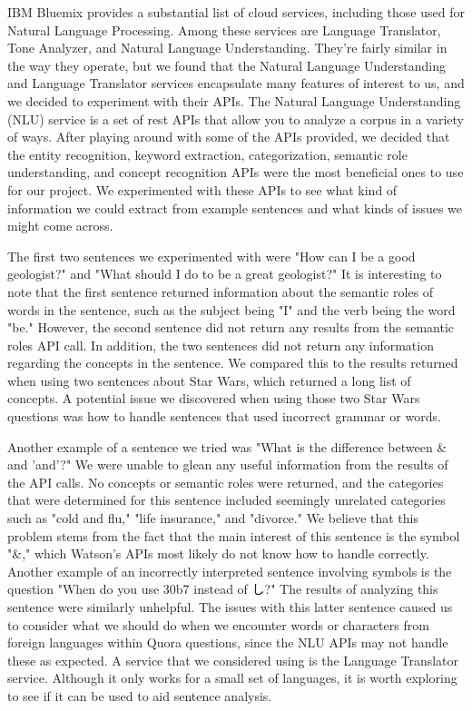 \documentclass{sig-alternate}
\begin{document}
IBM Bluemix provides a substantial list of cloud services, including those used for Natural Language Processing. Among these services are Language Translator, Tone Analyzer, and Natural Language Understanding. They're fairly similar in the way they operate, but we found that the Natural Language Understanding and Language Translator services encapsulate many features of interest to us, and we decided to experiment with their APIs. The Natural Language Understanding (NLU) service is a set of rest APIs that allow you to analyze a corpus in a variety of ways. After playing around with some of the APIs provided, we decided that the entity recognition, keyword extraction, categorization, semantic role understanding, and concept recognition APIs were the most beneficial ones to use for our project. We experimented with these APIs to see what kind of information we could extract from example sentences and what kinds of issues we might come across.

The first two sentences we experimented with were "How can I be a good geologist?" and "What should I do to be a great geologist?" It is interesting to note that the first sentence returned information about the semantic roles of words in the sentence, such as the subject being "I" and the verb being the word "be." However, the second sentence did not return any results from the semantic roles API call. In addition, the two sentences did not return any information regarding the concepts in the sentence. We compared this to the results returned when using two sentences about Star Wars, which returned a long list of concepts. A potential issue we discovered when using those two Star Wars questions was how to handle sentences that used incorrect grammar or words.

Another example of a sentence we tried was "What is the difference between \& and 'and'?" We were unable to glean any useful information from the results of the API calls. No concepts or semantic roles were returned, and the categories that were determined for this sentence included seemingly unrelated categories such as "cold and flu," "life insurance," and "divorce." We believe that this problem stems from the fact that the main interest of this sentence is the symbol "\&," which Watson's APIs most likely do not know how to handle correctly. Another example of an incorrectly interpreted sentence involving symbols is the question "When do you use \char30b7 instead of し?" The results of analyzing this sentence were similarly unhelpful. The issues with this latter sentence caused us to consider what we should do when we encounter words or characters from foreign languages within Quora questions, since the NLU APIs may not handle these as expected. A service that we considered using is the Language Translator service. Although it only works for a small set of languages, it is worth exploring to see if it can be used to aid sentence analysis.
\end{document}
